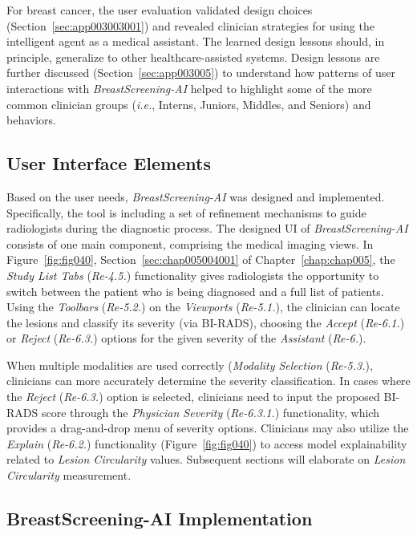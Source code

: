 For breast cancer, the user evaluation validated design choices (Section~\ref{sec:app003003001}) and revealed clinician strategies for using the intelligent agent as a medical assistant.
The learned design lessons should, in principle, generalize to other healthcare-assisted systems.
Design lessons are further discussed (Section~\ref{sec:app003005}) to understand how patterns of user interactions with {\it BreastScreening-AI} helped to highlight some of the more common clinician groups ({\it i.e.}, Interns, Juniors, Middles, and Seniors) and behaviors.

\subsection{User Interface Elements}
\label{sec:app003003002}

Based on the user needs, {\it BreastScreening-AI} was designed and implemented.
Specifically, the tool is including a set of refinement mechanisms to guide radiologists during the diagnostic process.
The designed \ac{UI} of {\it BreastScreening-AI} consists of one main component, comprising the medical imaging views.
\textcolor{revised}{In Figure~\ref{fig:fig040}, Section~\ref{sec:chap005004001} of Chapter~\ref{chap:chap005}}, the {\it Study List Tabs} ({\it Re-4.5.}) functionality gives radiologists the opportunity to switch between the patient who is being diagnosed and a full list of patients.
Using the {\it Toolbars} ({\it Re-5.2.}) on the {\it Viewports} ({\it Re-5.1.}), the clinician can locate the lesions and classify its severity (via \ac{BI-RADS}), choosing the {\it Accept} ({\it Re-6.1.}) or {\it Reject} ({\it Re-6.3.}) options for the given severity of the {\it Assistant} ({\it Re-6.}).

\textcolor{revised}{When multiple modalities are used correctly ({\it Modality Selection} ({\it Re-5.3.}), clinicians can more accurately determine the severity classification.
In cases where the {\it Reject} ({\it Re-6.3.}) option is selected, clinicians need to input the proposed \ac{BI-RADS} score through the {\it Physician Severity} ({\it Re-6.3.1.}) functionality, which provides a drag-and-drop menu of severity options.
Clinicians may also utilize the {\it Explain} ({\it Re-6.2.}) functionality (Figure~\ref{fig:fig040}) to access model explainability related to {\it Lesion Circularity} values.
Subsequent sections will elaborate on {\it Lesion Circularity} measurement.}

\subsection{BreastScreening-AI Implementation}
\label{sec:app003003003}

